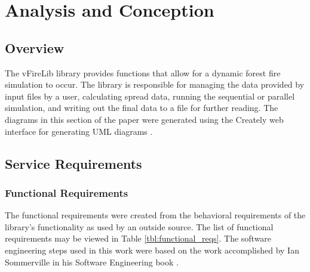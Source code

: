\chapter{Analysis and Conception}
\label{chapter:design}

\section{Overview}
The vFireLib library provides functions that allow for a dynamic forest fire simulation to occur. The library is responsible for managing the data provided by input files by a user, calculating spread data, running the sequential or parallel simulation, and writing out the final data to a file for further reading. The diagrams in this section of the paper were generated using the Creately web interface for generating UML diagrams \cite{creately}. 

\section{Service Requirements}

\subsection{Functional Requirements}
The functional requirements were created from the behavioral requirements of the library's functionality as used by an outside source. The list of functional requirements may be viewed in Table \ref{tbl:functional_reqs}. The software engineering steps used in this work were based on the work accomplished by Ian Sommerville in his Software Engineering book \cite{softwareengineering}.

